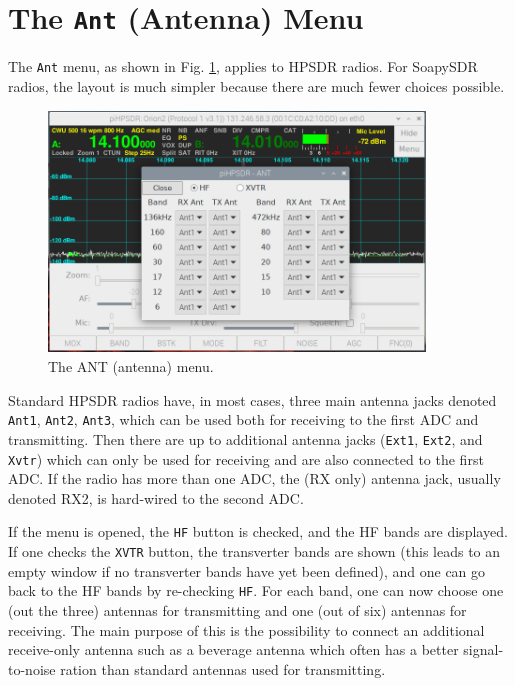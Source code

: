 \documentclass[12pt]{book}
\def\rett#1{\texttt{\color{red}#1}}
\def\bltt#1{\texttt{\color{blue}#1}}
\begin{document}
\section{The \texttt{Ant} (Antenna) Menu}

The \bltt{Ant} menu, as shown in Fig. \ref{fig:ANTmenu},
applies to HPSDR radios. For SoapySDR radios, the layout
is much simpler because there are much fewer choices possible.

\begin{figure}[ht]
\center
\includegraphics[width=10cm]{ANTmenu.png}
\caption{The ANT (antenna) menu.}
\label{fig:ANTmenu}
\end{figure}

 Standard HPSDR radios have, in most cases, three main antenna jacks
 denoted \rett{Ant1}, \rett{Ant2}, \rett{Ant3}, which can be used both for receiving to
 the first ADC and
 transmitting. Then there are up to additional antenna jacks (\rett{Ext1}, \rett{Ext2},
 and \rett{Xvtr}) which can only be used for receiving and are also connected
 to the first ADC. If the radio has more than one ADC, the (RX only)
 antenna jack, usually denoted RX2, is hard-wired to the second ADC.

 If the menu is opened, the \rett{HF} button is checked, and the HF bands
 are displayed. If one checks the \rett{XVTR} button, the transverter bands
 are shown (this leads to an empty window if no transverter bands have
 yet been defined), and one can go back to the HF bands by re-checking
 \rett{HF}.
 For each band, one can now choose one (out the three) antennas for
 transmitting and one (out of six) antennas for receiving. The main purpose
 of this is the possibility to connect an additional receive-only antenna
such as a beverage antenna which often has a better signal-to-noise
 ration than standard antennas used for transmitting.
\end{document}
